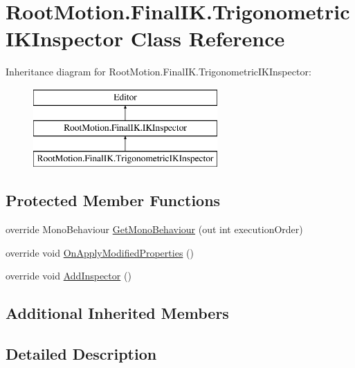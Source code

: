 \hypertarget{class_root_motion_1_1_final_i_k_1_1_trigonometric_i_k_inspector}{}\section{Root\+Motion.\+Final\+I\+K.\+Trigonometric\+I\+K\+Inspector Class Reference}
\label{class_root_motion_1_1_final_i_k_1_1_trigonometric_i_k_inspector}
Inheritance diagram for Root\+Motion.\+Final\+I\+K.\+Trigonometric\+I\+K\+Inspector\+:\begin{figure}[H]
\begin{center}
\leavevmode
\includegraphics[height=3.000000cm]{class_root_motion_1_1_final_i_k_1_1_trigonometric_i_k_inspector}
\end{center}
\end{figure}
\subsection*{Protected Member Functions}
\begin{DoxyCompactItemize}
\item 
override Mono\+Behaviour \mbox{\hyperlink{class_root_motion_1_1_final_i_k_1_1_trigonometric_i_k_inspector_a5480f458e1727afab24bb318e752aef8}{Get\+Mono\+Behaviour}} (out int execution\+Order)
\item 
override void \mbox{\hyperlink{class_root_motion_1_1_final_i_k_1_1_trigonometric_i_k_inspector_a164e4136ae40980590ea2d284d10a1e8}{On\+Apply\+Modified\+Properties}} ()
\item 
override void \mbox{\hyperlink{class_root_motion_1_1_final_i_k_1_1_trigonometric_i_k_inspector_a05d2542ef28ba5180b029c82502ed877}{Add\+Inspector}} ()
\end{DoxyCompactItemize}
\subsection*{Additional Inherited Members}


\subsection{Detailed Description}


